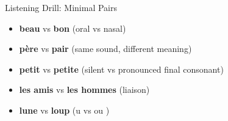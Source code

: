 \cyanheader
\begin{frame}{Listening Drill: Minimal Pairs}
\begin{itemize}
  \item \textbf{beau} \textipa{[bo]} vs \textbf{bon} \textipa{[bO\~{}]}  (oral vs nasal)
  \item \textbf{p\`ere} \textipa{[pER]} vs \textbf{pair} \textipa{[pER]}  (same sound, different meaning)
  \item \textbf{petit} \textipa{[p@ti]} vs \textbf{petite} \textipa{[p@tit]}  (silent vs pronounced final consonant)
  \item \textbf{les amis}  vs \textbf{les hommes} \textipa{[lez Om]}  (liaison)
  \item \textbf{lune} \textipa{[lyn]} vs \textbf{loup} \textipa{[lu]}  (u \textipa{[y]} vs ou \textipa{[u]})
\end{itemize}

\medskip
{}
\end{frame}
